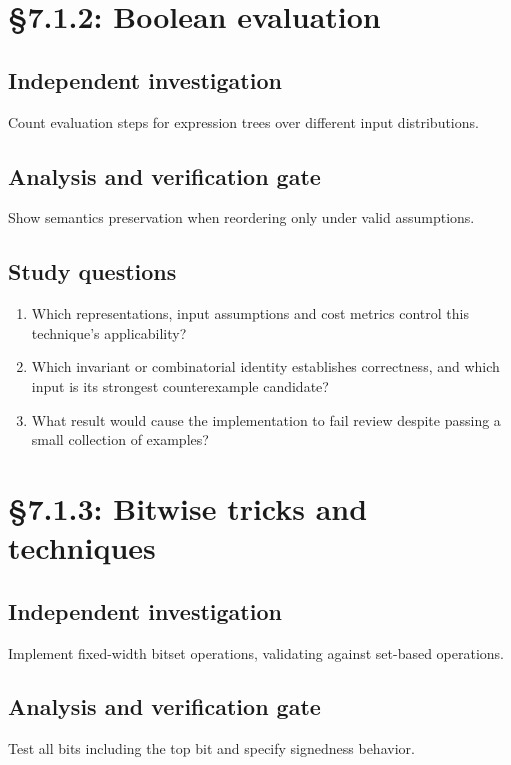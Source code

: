 \documentclass[11pt,letterpaper]{article}
\begin{document}
\section{\S 7.1.2: Boolean evaluation}
\subsection{Independent investigation}
Count evaluation steps for expression trees over different input distributions.
\subsection{Analysis and verification gate}
Show semantics preservation when reordering only under valid assumptions.
\subsection{Study questions}
\begin{enumerate}
\item Which representations, input assumptions and cost metrics control this technique's applicability?
\item Which invariant or combinatorial identity establishes correctness, and which input is its strongest counterexample candidate?
\item What result would cause the implementation to fail review despite passing a small collection of examples?
\end{enumerate}

\section{\S 7.1.3: Bitwise tricks and techniques}
\subsection{Independent investigation}
Implement fixed-width bitset operations, validating against set-based operations.
\subsection{Analysis and verification gate}
Test all bits including the top bit and specify signedness behavior.
\end{document}
